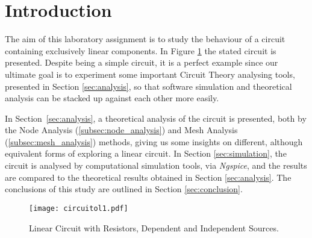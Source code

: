 \section{Introduction}
\label{sec:introduction}

\indent The aim of this laboratory assignment is to study the behaviour of a circuit containing exclusively linear components. In Figure \ref{fig:circuitol1} the stated circuit is presented. Despite being a simple circuit, it is a perfect example since our ultimate goal is to experiment some important Circuit Theory analysing tools, presented in Section \ref{sec:analysis}, so that software simulation and theoretical analysis can be stacked up against each other more easily.

In Section~\ref{sec:analysis}, a theoretical analysis of the circuit is
presented, both by the Node Analysis (\ref{subsec:node_analysis}) and Mesh Analysis (\ref{subsec:mesh_analysis}) methods, giving us some insights on different, although equivalent forms of exploring a linear circuit. In Section \ref{sec:simulation}, the circuit is analysed by computational simulation tools, via \textit{Ngspice}, and the results are compared to the theoretical results obtained in Section \ref{sec:analysis}. The conclusions of this study are outlined in Section \ref{sec:conclusion}.

\begin{figure}[h] \centering
\texttt{[image: circuitol1.pdf]}
\caption{Linear Circuit with Resistors, Dependent and Independent Sources.}
\label{fig:circuitol1}
\end{figure}

\clearpage
